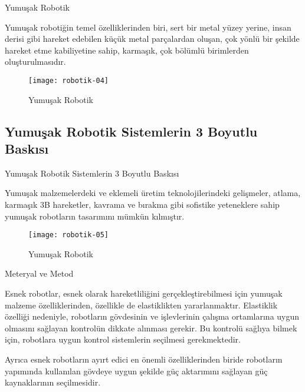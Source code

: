 \documentclass{beamer}
\begin{document}
\begin{frame}{Yumuşak Robotik}
\begin{block}
\item Yumuşak robotiğin temel özelliklerinden biri, sert bir metal yüzey yerine, insan derisi gibi hareket edebilen küçük metal parçalardan oluşan, çok yönlü bir şekilde hareket etme kabiliyetine sahip, karmaşık, çok bölümlü birimlerden oluşturulmasıdır.
\end{block}

\begin{figure}
\texttt{[image: robotik-04]}
\caption{\label{Şekil-4} Yumuşak Robotik}
\end{figure}

\end{frame}

\subsection{Yumuşak Robotik Sistemlerin 3 Boyutlu Baskısı}

\begin{frame}{Yumuşak Robotik Sistemlerin 3 Boyutlu Baskısı}
\begin{block}
\item Yumuşak malzemelerdeki ve eklemeli üretim teknolojilerindeki gelişmeler, atlama, karmaşık 3B hareketler, kavrama ve bırakma gibi sofistike yeteneklere sahip yumuşak robotların tasarımını mümkün kılmıştır.

\end{block}

\begin{figure}
\texttt{[image: robotik-05]}
\caption{\label{Şekil-5} Yumuşak Robotik}
\end{figure}

\end{frame}

\begin{frame}{Meteryal ve Metod}
\begin{block}
\item Esnek robotlar, esnek olarak hareketliliğini gerçekleştirebilmesi için yumuşak malzeme özelliklerinden, özellikle de elastiklikten yararlanmaktır. Elastiklik özelliği nedeniyle, robotların gövdesinin ve işlevlerinin çalışma ortamlarına uygun olmasını sağlayan kontrolün dikkate alınması gerekir. Bu kontrolü sağlıya bilmek için, robotlara uygun kontrol sistemlerin seçilmesi gerekmektedir.
\item Ayrıca esnek robotların ayırt edici en önemli özelliklerinden biride robotların yapımında kullanılan gövdeye uygun şekilde güç aktarımını sağlayan güç kaynaklarının seçilmesidir.
\end{block}
\end{frame}
\end{document}
